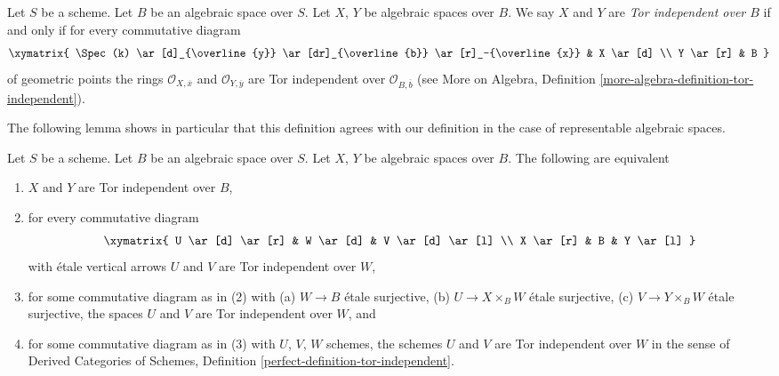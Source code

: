 \begin{definition}
\label{definition-tor-independent}
Let $S$ be a scheme. Let $B$ be an algebraic space over $S$.
Let $X$, $Y$ be algebraic spaces over $B$. We say $X$ and
$Y$ are {\it Tor independent over $B$} if and only if for every
commutative diagram
$$
\xymatrix{
\Spec(k) \ar[d]_{\overline{y}} \ar[dr]_{\overline{b}} \ar[r]_-{\overline{x}} &
X \ar[d] \\
Y \ar[r] & B
}
$$
of geometric points the rings
$\mathcal{O}_{X, \overline{x}}$ and $\mathcal{O}_{Y, \overline{y}}$
are Tor independent over $\mathcal{O}_{B, \overline{b}}$ (see
More on Algebra, Definition \ref{more-algebra-definition-tor-independent}).
\end{definition}

\noindent
The following lemma shows in particular that this definition agrees
with our definition in the case of representable algebraic spaces.

\begin{lemma}
\label{lemma-tor-independent}
Let $S$ be a scheme. Let $B$ be an algebraic space over $S$.
Let $X$, $Y$ be algebraic spaces over $B$. The following are equivalent
\begin{enumerate}
\item $X$ and $Y$ are Tor independent over $B$,
\item for every commutative diagram
$$
\xymatrix{
U \ar[d] \ar[r] & W \ar[d] & V \ar[d] \ar[l] \\
X \ar[r] & B & Y \ar[l]
}
$$
with \'etale vertical arrows $U$ and $V$ are Tor independent over $W$,
\item for some commutative diagram as in (2) with (a) $W \to B$ \'etale
surjective, (b) $U \to X \times_B W$ \'etale surjective, (c)
$V \to Y \times_B W$ \'etale surjective, the spaces $U$ and $V$ are Tor
independent over $W$, and
\item for some commutative diagram as in (3) with $U$, $V$, $W$ schemes,
the schemes $U$ and $V$ are Tor independent over $W$ in the sense of
Derived Categories of Schemes, Definition
\ref{perfect-definition-tor-independent}.
\end{enumerate}
\end{lemma}

